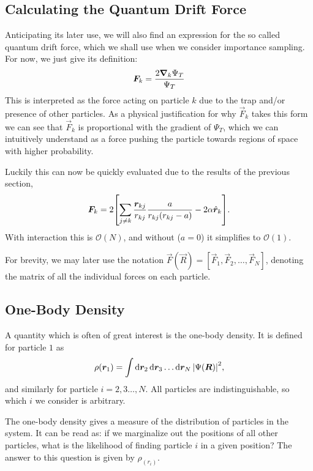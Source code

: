 \documentclass[twocolumn]{article}
\begin{document}
\subsection{Calculating the Quantum Drift Force}
Anticipating its later use, we will also find an expression for the so called
quantum drift force, which we shall use when we consider importance sampling.
For now, we just give its definition:
\begin{align}
    \bm F_k = \frac{2\grad_k\Psi_T}{\Psi_T}\label{eq:Q-force-def}
\end{align}
This is interpreted as the force acting on particle $k$ due to the trap and/or
presence of other particles. As a physical justification for why $\vec F_k$
takes this form we can see that $\vec F_k$ is
proportional with the gradient of $\Psi_T$, which we can intuitively understand
as a force pushing the particle towards regions of space with higher
probability. 

Luckily this can now be quickly evaluated due to
the results of the previous section,
\begin{align}
    \bm F_k = 2\qty[\sum_{j\neq k}\frac{\bm r_{kj}}{r_{kj}}
    \frac{a}{r_{kj}(r_{kj}-a)} - 2\alpha\hat{\bm
    r}_k].\label{eq:Q-force-explicit}
\end{align}
With interaction this is $\mathcal{O}(N)$, and without ($a=0$) it simplifies to $\mathcal{O}(1)$.

For brevity, we may later use the notation $\vec F(\vec R) = [\vec F_1, \vec
F_2,\dots,\vec F_N]$, denoting the matrix of all the individual forces on each
particle.

\subsection{One-Body Density}

A quantity which is often of great interest is the one-body density. It is defined for particle $1$ as
\begin{align}
    \rho(\bm r_1) = \int \dd{\bm r_2}\dd{\bm r_3}\dots\dd{\bm r_N} \abs{\Psi(\bm R)}^2\label{eq:one-body-def},
\end{align}
and similarly for particle $i = 2,3\dots, N$. All particles are indistinguishable, so which $i$ we consider is arbitrary.

The one-body density gives a measure of the distribution of particles in the
system. It can be read as: if we marginalize out the positions of all other
particles, what is the likelihood of finding particle $i$ in a given position?
The answer to this question is given by $\rho_(r_i)$.
\end{document}
